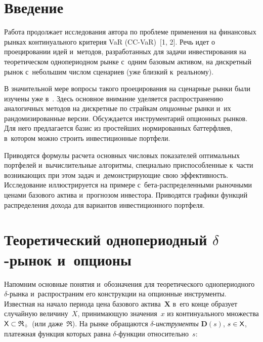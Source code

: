\thispagestyle{headings}

\begin{multicols}{2}

\label{st\stat}
  
  \section{Введение}
  
  Работа продолжает исследования автора по проб\-ле\-ме применения на 
финансовых рынках континуального критерия VaR (CC-VaR)~[1, 2]. Речь идет 
о проецировании идей и~методов, разработанных для задачи инвестирования на 
теоретическом однопериодном рынке с~одним базовым активом, на дискретный 
рынок с~небольшим числом сценариев (уже близкий к~реальному). 
  
  В значительной мере вопросы такого проецирования на сценарные рынки 
были изучены уже в~\cite{1-aga, 2-aga, 3-aga, 4-aga}. Здесь основное внимание 
уделяется распространению аналогичных методов на дискретные по страйкам 
\textit{опционные} рынки и~их рандомизированные версии. Обсуждается 
инструментарий опционных рынков. Для него предлагается базис из 
простейших нормированных баттерфляев, в~котором можно строить 
инвестиционные портфели. 
  
  Приводятся формулы расчета основных числовых показателей оптимальных 
портфелей и~вычислительные алгоритмы, специально при\-спо\-соб\-лен\-ные к~части 
возникающих при этом задач и~демонстрирующие свою эффективность. 
Исследование иллюстрируется на примере с~бета-распределенными рыночными 
ценами базового актива и~прогнозом инвестора. Приводятся графики функций 
распределения дохода для вариантов инвестиционного портфеля. 
  
  \section{Теоретический однопериодный $\delta$-рынок 
и~опционы}
  
  Напомним основные понятия и~обозначения для теоретического 
однопериодного $\delta$-рын\-ка и~распространим его конструкции на 
опционные инструменты. Известная на начало периода цена базового 
актива~$\boldsymbol{X}$ в~его конце образует случайную 
величину~${X}$, принимающую значения~$x$ из континуального 
множества ${\sf X}\hm\subset \mathfrak{R}_+$ (или даже~$\mathfrak{R}$). На 
рынке обращаются  
$\delta$-\textit{инструменты} $\boldsymbol{D}(s)$, $s\hm\in {\sf X}$, платежная 
функция которых равна $\delta$-функ\-ции относительно~$s$: 


\end{multicols}
